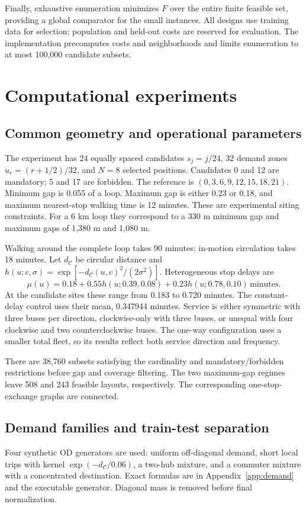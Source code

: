 \documentclass[11pt]{article}
\theoremstyle{remark}\newtheorem{remark}[theorem]{Remark}
\newcommand{\C}{\mathcal C}
\begin{document}
Finally, exhaustive enumeration minimizes $F$ over the entire finite feasible set, providing a global comparator for the small instances. All designs use training data for selection; population and held-out costs are reserved for evaluation. The implementation precomputes costs and neighborhoods and limits enumeration to at most 100,000 candidate subsets.

\section{Computational experiments}\label{sec:experiment}
\subsection{Common geometry and operational parameters}
The experiment has 24 equally spaced candidates $s_j=j/24$, 32 demand zones $u_r=(r+1/2)/32$, and $N=8$ selected positions. Candidates 0 and 12 are mandatory; 5 and 17 are forbidden. The reference is $(0,3,6,9,12,15,18,21)$. Minimum gap is 0.055 of a loop. Maximum gap is either 0.23 or 0.18, and maximum nearest-stop walking time is 12 minutes. These are experimental siting constraints. For a 6 km loop they correspond to a 330 m minimum gap and maximum gaps of 1,380 m and 1,080 m.

Walking around the complete loop takes 90 minutes; in-motion circulation takes 18 minutes. Let $d_\C$ be circular distance and $h(u;c,\sigma)=\exp[-d_\C(u,c)^2/(2\sigma^2)]$. Heterogeneous stop delays are
\begin{equation}
\mu(u)=0.18+0.55h(u;0.39,0.08)+0.23h(u;0.78,0.10)\,\text{minutes}.\label{eq:dwell}
\end{equation}
At the candidate sites these range from 0.183 to 0.720 minutes. The constant-delay control uses their mean, 0.347944 minutes. Service is either symmetric with three buses per direction, clockwise-only with three buses, or unequal with four clockwise and two counterclockwise buses. The one-way configuration uses a smaller total fleet, so its results reflect both service direction and frequency.

There are 38,760 subsets satisfying the cardinality and mandatory/forbidden restrictions before gap and coverage filtering. The two maximum-gap regimes leave 508 and 243 feasible layouts, respectively. The corresponding one-stop-exchange graphs are connected.

\subsection{Demand families and train-test separation}
Four synthetic OD generators are used: uniform off-diagonal demand, short local trips with kernel $\exp(-d_\C/0.06)$, a two-hub mixture, and a commuter mixture with a concentrated destination. Exact formulas are in Appendix~\ref{app:demand} and the executable generator. Diagonal mass is removed before final normalization.
\end{document}

